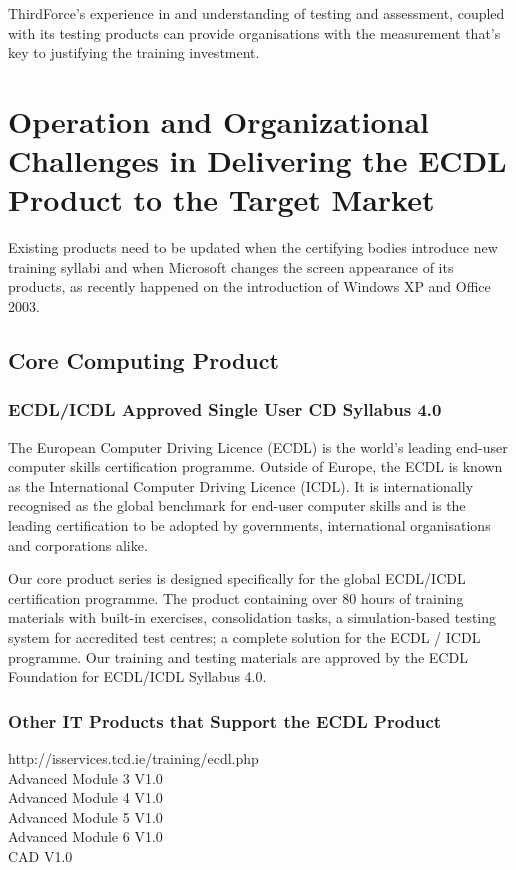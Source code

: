 \documentclass[a4paper,12pt]{article}
\begin{document}
ThirdForce's experience in and understanding of testing and
assessment, coupled with its testing products can provide organisations
with the measurement that's key to justifying the training
investment.

\section*{Operation and Organizational Challenges in Delivering the ECDL Product
to the Target Market}

Existing products need to be updated when the certifying bodies
introduce new training syllabi and when Microsoft changes the screen
appearance of its products, as recently happened on the introduction of
Windows XP and Office 2003.

\subsection*{Core Computing Product}

\subsubsection*{ECDL/ICDL Approved Single User CD Syllabus 4.0}

The European Computer Driving Licence (ECDL) is the world's leading
end-user computer skills certification programme. Outside of Europe, the
ECDL is known as the International Computer Driving Licence (ICDL).
It is internationally recognised as the global benchmark for end-user
computer skills and is the leading certification to be adopted by
governments, international organisations and corporations alike.

Our core product series is designed specifically for the global ECDL/ICDL 
certification programme. The product containing over 80 hours of
training materials with built-in exercises, consolidation tasks, a
simulation-based testing system for accredited test centres; a complete
solution for the ECDL / ICDL programme. Our training and testing
materials are approved by the ECDL Foundation for ECDL/ICDL Syllabus
4.0.

\subsubsection{Other IT Products that Support the ECDL Product}

http://isservices.tcd.ie/training/ecdl.php \\
Advanced Module 3 V1.0 \\
Advanced Module 4 V1.0 \\
Advanced Module 5 V1.0 \\
Advanced Module 6 V1.0 \\
CAD V1.0 \\
\end{document}
